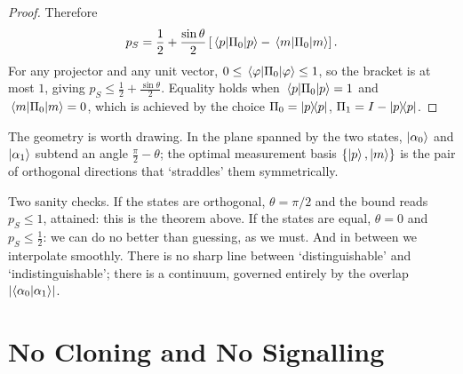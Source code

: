 \documentclass[a4paper]{scrartcl}
\begin{document}
\begin{proof}
	Therefore
	$$p_S = \frac12 + \frac{\sin\theta}{2}\left[\mel{p}{\Pi_0}{p} - \mel{m}{\Pi_0}{m}\right].$$
	For any projector and any unit vector, $0 \leq \mel{\varphi}{\Pi_0}{\varphi} \leq 1$, so the bracket is at most $1$, giving $p_S \leq \tfrac12 + \tfrac{\sin\theta}{2}$. Equality holds when $\mel{p}{\Pi_0}{p} = 1$ and $\mel{m}{\Pi_0}{m} = 0$, which is achieved by the choice $\Pi_0 = \op{p}{p}$, $\Pi_1 = I - \op{p}{p}$.
\end{proof}

The geometry is worth drawing. In the plane spanned by the two states, $\ket{\alpha_0}$ and $\ket{\alpha_1}$ subtend an angle $\tfrac{\pi}{2} - \theta$; the optimal measurement basis $\{\ket{p},\ket{m}\}$ is the pair of orthogonal directions that `straddles' them symmetrically.

\begin{center}
\end{center}

Two sanity checks. If the states are orthogonal, $\theta = \pi/2$ and the bound reads $p_S \le 1$, attained: this is the theorem above. If the states are equal, $\theta = 0$ and $p_S \leq \tfrac12$: we can do no better than guessing, as we must. And in between we interpolate smoothly. There is no sharp line between `distinguishable' and `indistinguishable'; there is a continuum, governed entirely by the overlap $\abs{\ip{\alpha_0}{\alpha_1}}$.

\section{No Cloning and No Signalling}
\end{document}
